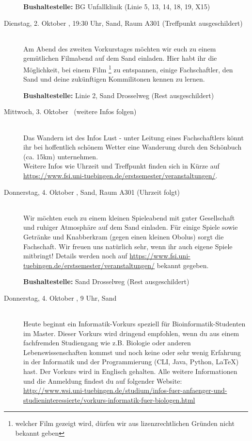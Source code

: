 \begin{description}
\textbf{Bushaltestelle:} BG Unfallklinik (Linie 5, 13, 14, 18, 19, X15)

\item[Dienstag, 2. Oktober \Jahr, 19:30 Uhr, Sand, Raum A301 (Treffpunkt ausgeschildert)]\ \\
Am Abend des zweiten Vorkurstages möchten wir euch zu einem gemütlichen Filmabend auf dem Sand einladen.
Hier habt ihr die Möglichkeit, bei einem Film \footnote{welcher Film gezeigt wird, dürfen wir aus lizenzrechtlichen Gründen nicht bekannt geben} zu entspannen, einige Fachschaftler, den Sand und deine zukünftigen Kommilitonen kennen zu lernen.

\textbf{Bushaltestelle:} Linie 2, Sand Drosselweg (Rest ausgeschildert) 

\item[Mittwoch, 3. Oktober \Jahr~(weitere Infos folgen)]\ \\
Das Wandern ist des Infos Lust - unter Leitung eines Fachschaftlers könnt ihr bei hoffentlich schönem Wetter eine Wanderung durch den Schönbuch (ca. 15km) unternehmen. \\
Weitere Infos wie Uhrzeit und Treffpunkt finden sich in Kürze auf \url{https://www.fsi.uni-tuebingen.de/erstsemester/veranstaltungen/}.

\item[Donnerstag, 4. Oktober \Jahr, Sand, Raum A301 (Uhrzeit folgt)]\ \\
Wir möchten euch zu einem kleinen Spieleabend mit guter Gesellschaft und ruhiger Atmosphäre auf dem Sand einladen. Für einige Spiele sowie Getränke und Knabberkram (gegen einen kleinen Obolus) sorgt die Fachschaft. Wir freuen uns natürlich sehr, wenn ihr auch eigene Spiele mitbringt! Details werden noch auf \url{https://www.fsi.uni-tuebingen.de/erstsemester/veranstaltungen/} bekannt gegeben.

\textbf{Bushaltestelle:} Sand Drosselweg (Rest ausgeschildert) 

\ifmaster
\ifbinfo
\item[Donnerstag, 4. Oktober \Jahr, 9 Uhr, Sand]\ \\
 Heute beginnt ein Informatik-Vorkurs speziell für Bioinformatik-Studenten im Master. Dieser Vorkurs wird dringend empfohlen, wenn du aus einem fachfremden Studiengang wie z.B. Biologie oder anderen Lebenswissenschaften kommst und noch keine oder sehr wenig Erfahrung in der Informatik und der Programmierung (CLI, Java, Python, \LaTeX) hast. Der Vorkurs wird in Englisch gehalten. Alle weitere Informationen und die Anmeldung findest du auf folgender Website: \\ \url{http://www.wsi.uni-tuebingen.de/studium/infos-fuer-anfaenger-und-studieninteressierte/vorkurs-informatik-fuer-biologen.html}


\end{description}
